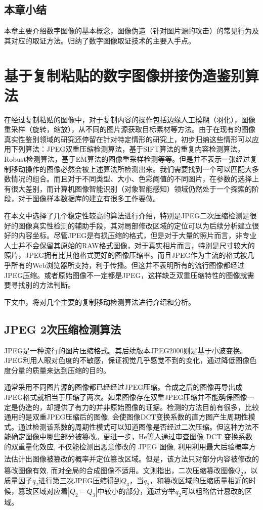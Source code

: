 \documentclass[a4paper, 10pt, notitlepage]{report}
\newcommand{\supercite}[1]{\textsuperscript{\cite{#1}}}
\begin{document}
	\section{本章小结}
		本章主要介绍数字图像的基本概念，图像伪造（针对图片源的攻击）的常见行为及其对应的取证方法。归纳了数字图像取证技术的主要入手点。
		

\chapter{基于复制粘贴的数字图像拼接伪造鉴别算法}
	在经过复制粘贴的图像中，对于复制内容的操作包括边缘人工模糊（羽化），图像重采样（旋转，缩放），从不同的图片源获取目标素材等方法。由于在现有的图像真实性鉴别领域的研究还停留在针对特定情形的研究上，初步归纳这些情形可以应用下列算法：JPEG双重压缩检测算法，基于SIFT算法的重复内容检测算法，Robust检测算法，基于EM算法的图像重采样检测等等。但是并不表示一张经过复制移动操作的图像必然会被上述算法所检测出来。我们需要找到一个可以匹配大多数情况的组合。而且对于不同类型、大小、色彩阈值的不同图片，在参数的选择上有很大差别，而计算机图像智能识别（对象智能感知）领域仍然处于一个探索的阶段，对于图像样本数据库的建立有很多工作要做。

	在本文中选择了几个稳定性较高的算法进行介绍，特别是JPEG二次压缩检测是很好的图像真实性检测的辅助手段，其对局部修改区域的定位可以为后续分析建立很好的内容坐标。尽管JPEG是有损压缩的格式，但是对于大量的照片而言，非专业人士并不会保留其原始的RAW格式图像，对于真实相片而言，特别是尺寸较大的照片，JPEG拥有比其他格式更好的图像压缩率。而且JPEG作为主流的格式被几乎所有的Web浏览器所支持，利于传播。但这并不表明所有的流行图像都经过JPEG压缩。或者原始图像不一定都是JPEG，这样缺乏双重压缩特性的图像就需要寻找别的方法判断。

	下文中，将对几个主要的复制移动检测算法进行介绍和分析。

	\section{JPEG 2次压缩检测算法}
		JPEG是一种流行的图片压缩格式。其后续版本JPEG2000则是基于小波变换。JPEG利用人眼对色度的不敏感，保证视觉几乎感觉不到的变化，通过降低图像色度分量的质量来达到压缩的目的。

		通常采用不同图片源的图像都已经经过JPEG压缩。合成之后的图像再导出成JPEG格式就相当于压缩了两次。如果图像存在双重JPEG压缩并不能确保图像一定是伪造的，却提供了有力的并非原始图像的证据。检测的方法目前有很多，比较通用的是双重JPEG压缩后的图像, 会使图像DCT变换系数的直方图产生周期性模式。通过检测该系数的周期性模式可以知道图像是否经过二次压缩。但这种方法不能确定图像中哪些部分被篡改。更进一步，He等人通过审查图像 DCT 变换系数的双重量化效应, 不仅能检测出恶意修改的 JPEG 图像, 利用利用最大后验概率方法估计出图像被篡改的概率并定位篡改区域\supercite{he2006detecting}。但是，该方法只对部分内容被修改的篡改图像有效, 而对全局的合成图像不适用。文\supercite{jpegghost}则指出，二次压缩篡改图像$Q_2$，以质量因子$q_2$进行第三次JPEG压缩得到$Q_3$，当$q_2$，和篡改区域的压缩质量相近的时候，篡改区域对应着$|Q_2-Q_3|$中较小的部分，通过穷举$q_2$可以粗略估计篡改的区域。
\end{document}
